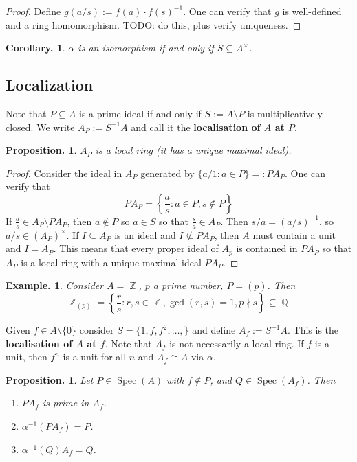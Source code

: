 \documentclass[11pt, a4paper]{memoir}
\DeclareMathOperator{\Q}{{\mathbb{Q}}}
\DeclareMathOperator{\Z}{{\mathbb{Z}}}
\newcommand{\mbf}[1]{{\boldmath\bfseries #1}}
\theoremstyle{change}
\newtheorem{corollary}[theorem]{Corollary.}
\newtheorem{proposition}[theorem]{Proposition.}
\theoremstyle{plain}
\theoremstyle{nonumberplain}
\newtheorem{example}{Example.}
\newtheorem{proof}{Proof}
\DeclareMathOperator{\Spec}{Spec}
\numberwithin{equation}{section}
\begin{document}
\begin{proof}
    Define $g(a/s):=f(a)\cdot f(s)^{-1}$.
    One can verify that $g$ is well-defined and a ring homomorphism.
    TODO: do this, plus verify uniqueness.
\end{proof}
\begin{corollary}
    $\alpha$ is an isomorphism if and only if $S\subseteq A^\times$.
\end{corollary}
\subsection{Localization}
Note that $P\subseteq A$ is a prime ideal if and only if $S:=A\setminus P$ is multiplicatively closed.
We write $A_P:=S^{-1}A$ and call it the \mbf{localisation of $A$ at $P$}.
\begin{proposition}
    $A_P$ is a local ring (it has a unique maximal ideal).
\end{proposition}
\begin{proof}
    Consider the ideal in $A_P$ generated by $\{a/1:a\in P\}=:PA_P$.
    One can verify that
    \begin{equation*}
        PA_P=\left\{\frac{a}{s}:a\in P,s\notin P\right\}
    \end{equation*}
    If $\frac{a}{s}\in A_P\setminus PA_P$, then $a\notin P$ so $a\in S$ so that $\frac{s}{a}\in A_P$.
    Then $s/a=(a/s)^{-1}$, so $a/s\in (A_P)^\times$.
    If $I\subseteq A_P$ is an ideal and $I\not\subseteq PA_P$, then $A$ must contain a unit and $I=A_P$.
    This means that every proper ideal of $A_p$ is contained in $PA_P$ so that $A_P$ is a local ring with a unique maximal ideal $PA_P$.
\end{proof}
\begin{example}
    Consider $A=\Z$, $p$ a prime number, $P=(p)$.
    Then
    \begin{equation*}
        \Z_{(p)}=\left\{\frac{r}{s}:r,s\in\Z,\gcd(r,s)=1,p\nmid s\right\}\subseteq\Q
    \end{equation*}
\end{example}
Given $f\in A\setminus\{0\}$ consider $S=\{1,f,f^2,\ldots,\}$ and define $A_f:= S^{-1}A$.
This is the \mbf{localisation of $A$ at $f$}.
Note that $A_f$ is not necessarily a local ring.
If $f$ is a unit, then $f^n$ is a unit for all $n$ and $A_f\cong A$ via $\alpha$.
\begin{proposition}
    Let $P\in\Spec(A)$ with $f\notin P$, and $Q\in\Spec(A_f)$.
    Then
    \begin{enumerate}[nolistsep]
        \item $PA_f$ is prime in $A_f$.
        \item $\alpha^{-1}(PA_f)=P$.
        \item $\alpha^{-1}(Q)A_f=Q$.
    \end{enumerate}
\end{proposition}
\end{document}
